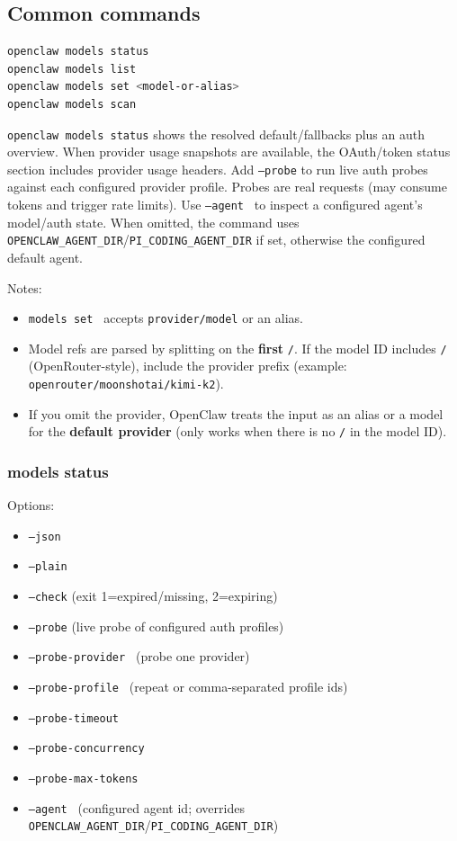 \subsection{Common commands}


\begin{lstlisting}[language=bash]
openclaw models status
openclaw models list
openclaw models set <model-or-alias>
openclaw models scan
\end{lstlisting}


\texttt{openclaw models status} shows the resolved default/fallbacks plus an auth overview.
When provider usage snapshots are available, the OAuth/token status section includes
provider usage headers.
Add \texttt{--probe} to run live auth probes against each configured provider profile.
Probes are real requests (may consume tokens and trigger rate limits).
Use \texttt{--agent } to inspect a configured agent’s model/auth state. When omitted,
the command uses \texttt{OPENCLAW\_AGENT\_DIR}/\texttt{PI\_CODING\_AGENT\_DIR} if set, otherwise the
configured default agent.

Notes:

\begin{itemize}
  \item \texttt{models set } accepts \texttt{provider/model} or an alias.
  \item Model refs are parsed by splitting on the \textbf{first} \texttt{/}. If the model ID includes \texttt{/} (OpenRouter-style), include the provider prefix (example: \texttt{openrouter/moonshotai/kimi-k2}).
  \item If you omit the provider, OpenClaw treats the input as an alias or a model for the \textbf{default provider} (only works when there is no \texttt{/} in the model ID).
\end{itemize}


\subsubsection{models status}


Options:

\begin{itemize}
  \item \texttt{--json}
  \item \texttt{--plain}
  \item \texttt{--check} (exit 1=expired/missing, 2=expiring)
  \item \texttt{--probe} (live probe of configured auth profiles)
  \item \texttt{--probe-provider } (probe one provider)
  \item \texttt{--probe-profile } (repeat or comma-separated profile ids)
  \item \texttt{--probe-timeout }
  \item \texttt{--probe-concurrency }
  \item \texttt{--probe-max-tokens }
  \item \texttt{--agent } (configured agent id; overrides \texttt{OPENCLAW\_AGENT\_DIR}/\texttt{PI\_CODING\_AGENT\_DIR})
\end{itemize}


